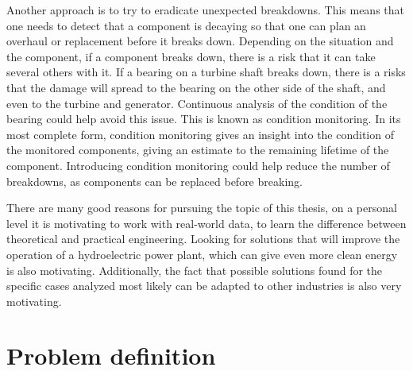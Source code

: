 Another approach is to try to eradicate unexpected breakdowns. This means that one needs to detect that a component is decaying so that one can plan an overhaul or replacement before it breaks down. Depending on the situation and the component, if a component breaks down, there is a risk that it can take several others with it. If a bearing on a turbine shaft breaks down, there is a risks that the damage will spread to the bearing on the other side of the shaft, and even to the turbine and generator. Continuous analysis of the condition of the bearing could help avoid this issue. This is known as condition monitoring. In its most complete form, condition monitoring gives an insight into the condition of the monitored components, giving an estimate to the remaining lifetime of the component. Introducing condition monitoring could help reduce the number of breakdowns, as components can be replaced before breaking.

There are many good reasons for pursuing the topic of this thesis, on a personal level it is motivating to work with real-world data, to learn the difference between theoretical and practical engineering. Looking for solutions that will improve the operation of a hydroelectric power plant, which can give even more clean energy is also motivating. Additionally, the fact that possible solutions found for the specific cases analyzed most likely can be adapted to other industries is also very motivating. 




    


\section{Problem definition}

